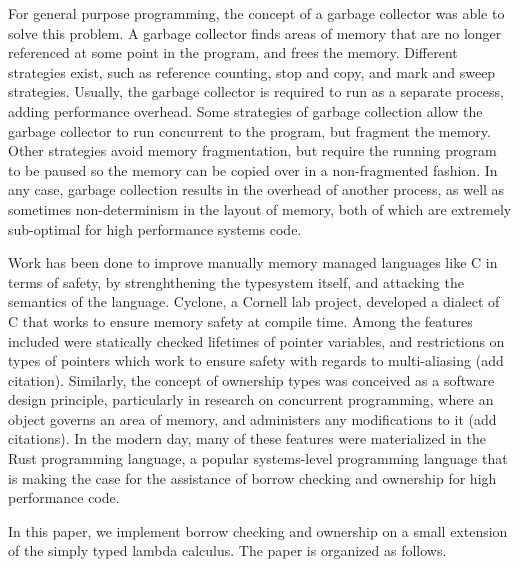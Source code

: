\documentclass[letterpaper,11pt]{article}
\begin{document}
For general purpose programming, the concept of a garbage collector was able to solve
this problem. A garbage collector finds areas of memory that are no longer referenced
at some point in the program, and frees the memory. Different strategies exist, such
as reference counting, stop and copy, and mark and sweep strategies. Usually, the
garbage collector is required to run as a separate process, adding performance
overhead. Some strategies of garbage collection allow the garbage collector to run
concurrent to the program, but fragment the memory. Other strategies avoid memory
fragmentation, but require the running program to be paused so the memory can be
copied over in a non-fragmented fashion. In any case, garbage collection results
in the overhead of another process, as well as sometimes non-determinism in the layout
of memory, both of which are extremely sub-optimal for high performance systems code.

Work has been done to improve manually memory managed languages like C in terms of
safety, by strenghthening the typesystem itself, and attacking the semantics of the
language. Cyclone, a Cornell lab project, developed a dialect of C that works to
ensure memory safety at compile time. Among the features included were statically
checked lifetimes of pointer variables, and restrictions on types of pointers which
work to ensure safety with regards to multi-aliasing (add citation). Similarly, the
concept of ownership types was conceived as a software design principle, particularly
in research on concurrent programming, where an object governs an area of memory,
and administers any modifications to it (add citations). In the modern day,
many of these features were materialized in the Rust programming language, a popular
systems-level programming language that is making the case for the assistance of
borrow checking and ownership for high performance code.

In this paper, we implement borrow checking and ownership on a small extension of the
simply typed lambda calculus. The paper is organized as follows.
\end{document}
